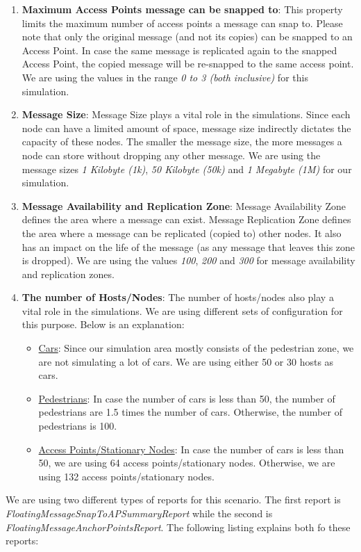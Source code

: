 \begin{enumerate}
	\item \textbf{Maximum Access Points message can be snapped to}: This property limits the maximum number of access points a message can snap to. Please note that only the original message (and not its copies) can be snapped to an Access Point. In case the same message is replicated again to the snapped Access Point, the copied message will be re-snapped to the same access point. We are using the values in the range \textit{0 to 3 (both inclusive)} for this simulation.
	\item \textbf{Message Size}: Message Size plays a vital role in the simulations. Since each node can have a limited amount of space, message size indirectly dictates the capacity of these nodes. The smaller the message size, the more messages a node can store without dropping any other message. We are using the message sizes \textit{1 Kilobyte (1k)}, \textit{50 Kilobyte (50k)} and \textit{1 Megabyte (1M)} for our simulation.
	\item \textbf{Message Availability and Replication Zone}: Message Availability Zone defines the area where a message can exist. Message Replication Zone defines the area where a message can be replicated (copied to) other nodes. It also has an impact on the life of the message (as any message that leaves this zone is dropped). We are using the values \textit{100}, \textit{200} and \textit{300} for message availability and replication zones.
	\item \textbf{The number of Hosts/Nodes}: The number of hosts/nodes also play a vital role in the simulations. We are using different sets of configuration for this purpose. Below is an explanation:
		\begin{itemize}
			\item \underline{Cars}: Since our simulation area mostly consists of the pedestrian zone, we are not simulating a lot of cars. We are using either 50 or 30 hosts as cars.
			\item \underline{Pedestrians}: In case the number of cars is less than 50, the number of pedestrians are 1.5 times the number of cars. Otherwise, the number of pedestrians is 100.
			\item \underline{Access Points/Stationary Nodes}: In case the number of cars is less than 50, we are using 64 access points/stationary nodes. Otherwise, we are using 132 access points/stationary nodes.
		\end{itemize}
\end{enumerate}
\vspace{2mm}
We are using two different types of reports for this scenario. The first report is \textit{FloatingMessageSnapToAPSummaryReport} while the second is \textit{FloatingMessageAnchorPointsReport}. The following listing explains both fo these reports:

